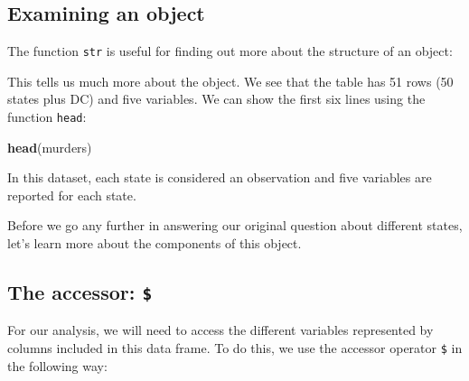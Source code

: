\documentclass[
]{krantz}
\newenvironment{Shaded}{\begin{snugshade}}{\end{snugshade}}
\newcommand{\CommentTok}[1]{\textcolor[rgb]{0.37,0.37,0.37}{\textit{#1}}}
\newcommand{\KeywordTok}[1]{\textcolor[rgb]{0.27,0.27,0.27}{\textbf{#1}}}
\newcommand{\NormalTok}[1]{#1}
\begin{document}
\hypertarget{examining-an-object}{%
\subsection{Examining an object}\label{examining-an-object}}

The function \texttt{str} is useful for finding out more about the structure of an object:

\begin{Shaded}
\end{Shaded}

This tells us much more about the object. We see that the table has 51 rows (50 states plus DC) and five variables. We can show the first six lines using the function \texttt{head}:

\begin{Shaded}
\begin{Highlighting}[]
\KeywordTok{head}\NormalTok{(murders)}
\end{Highlighting}
\end{Shaded}

In this dataset, each state is considered an observation and five variables are reported for each state.

Before we go any further in answering our original question about different states, let's learn more about the components of this object.

\hypertarget{the-accessor}{%
\subsection{\texorpdfstring{The accessor: \texttt{\$}}{The accessor: \$}}\label{the-accessor}}

For our analysis, we will need to access the different variables represented by columns included in this data frame. To do this, we use the accessor operator \texttt{\$} in the following way:
\end{document}
